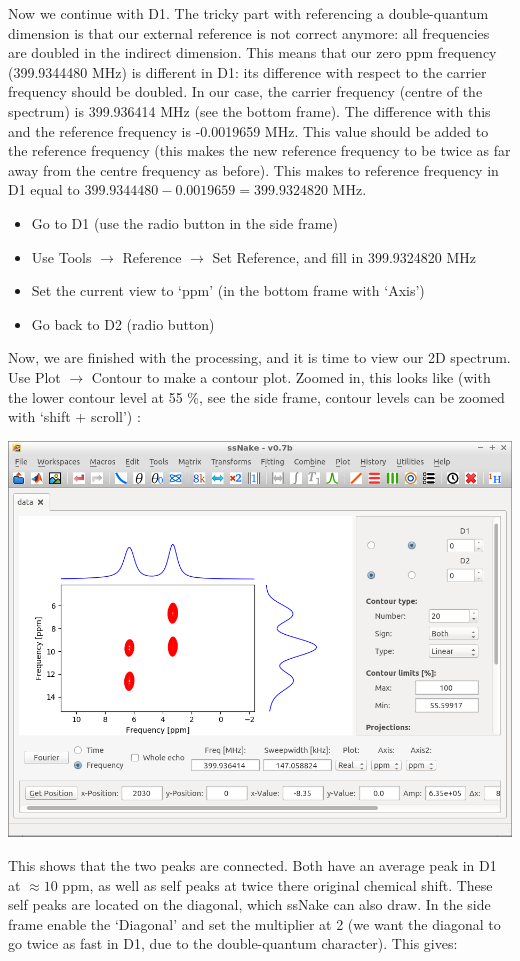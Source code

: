 \documentclass[11pt,a4paper]{article}
\begin{document}
Now we continue with D1. The tricky part with referencing a double-quantum dimension is that our
external reference is not correct anymore: all frequencies are doubled in the indirect dimension.
This means that our zero ppm frequency (399.9344480 MHz) is different in D1: its difference with
respect to the carrier frequency should be doubled. In our case, the carrier frequency (centre of
the spectrum) is 399.936414 MHz (see the bottom frame). The difference with this and the reference
frequency is -0.0019659 MHz. This value should be added to the reference frequency (this makes the
new reference frequency to be twice as far away from the centre frequency as before). This makes to
reference frequency in D1 equal to  $399.9344480 -0.0019659 = 399.9324820$ MHz.

\begin{itemize}
  \item Go to D1 (use the radio button in the side frame)
  \item Use Tools $\longrightarrow$ Reference $\longrightarrow$ Set Reference, and fill in
399.9324820 MHz
	 	\item Set the current view to `ppm' (in the bottom frame with `Axis')
	\item Go back to D2 (radio button)
\end{itemize}
Now, we are finished with the processing, and it is time to view our 2D spectrum. Use Plot
$\longrightarrow$ Contour to make a contour plot. Zoomed in, this looks like (with the lower contour
level at 55 \%, see the side frame, contour levels can be zoomed with `shift + scroll') :

\begin{center}
\includegraphics[width=0.7\linewidth]{Figs/Fig7.png}
\end{center}
This shows that the two peaks are connected. Both have an average peak in D1 at $\approx 10$ ppm, as
well as self peaks at twice there original chemical shift. These self peaks are located on the
diagonal, which ssNake can also draw. In the side frame enable the `Diagonal' and set the
multiplier at 2 (we want the diagonal to go twice as fast in D1, due to the double-quantum
character). This gives:
\end{document}
